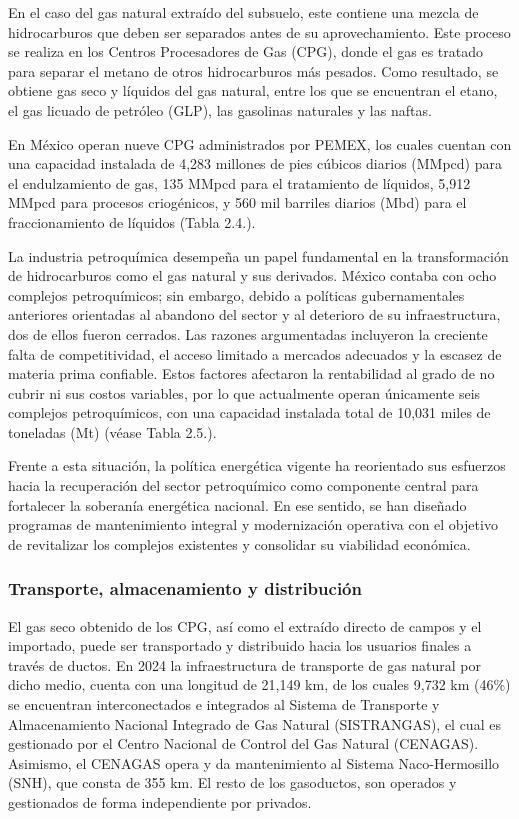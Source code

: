 \documentclass{sener2025}
\begin{document}
En el caso del gas natural extraído del subsuelo, este contiene una mezcla de hidrocarburos que deben ser separados antes de su aprovechamiento. Este proceso se realiza en los Centros Procesadores de Gas (CPG), donde el gas es tratado para separar el metano de otros hidrocarburos más pesados. Como resultado, se obtiene gas seco y líquidos del gas natural, entre los que se encuentran el etano, el gas licuado de petróleo (GLP), las gasolinas naturales y las naftas.

En México operan nueve CPG administrados por PEMEX, los cuales cuentan con una capacidad instalada de 4,283 millones de pies cúbicos diarios (MMpcd) para el endulzamiento de gas, 135 MMpcd para el tratamiento de líquidos, 5,912 MMpcd para procesos criogénicos, y 560 mil barriles diarios (Mbd) para el fraccionamiento de líquidos (Tabla 2.4.).

La industria petroquímica desempeña un papel fundamental en la transformación de hidrocarburos como el gas natural y sus derivados. México contaba con ocho complejos petroquímicos; sin embargo, debido a políticas gubernamentales anteriores orientadas al abandono del sector y al deterioro de su infraestructura, dos de ellos fueron cerrados. Las razones argumentadas incluyeron la creciente falta de competitividad, el acceso limitado a mercados adecuados y la escasez de materia prima confiable. Estos factores afectaron la rentabilidad al grado de no cubrir ni sus costos variables, por lo que actualmente operan únicamente seis complejos petroquímicos, con una capacidad instalada total de 10,031 miles de toneladas (Mt) (véase Tabla 2.5.).

Frente a esta situación, la política energética vigente ha reorientado sus esfuerzos hacia la recuperación del sector petroquímico como componente central para fortalecer la soberanía energética nacional. En ese sentido, se han diseñado programas de mantenimiento integral y modernización operativa con el objetivo de revitalizar los complejos existentes y consolidar su viabilidad económica.


\subsubsection{Transporte, almacenamiento y distribución}

El gas seco obtenido de los CPG, así como el extraído directo de campos y el importado, puede ser transportado y distribuido hacia los usuarios finales a través de ductos. En 2024 la infraestructura de transporte de gas natural por dicho medio, cuenta con una longitud de 21,149 km, de los cuales 9,732 km (46\%) se encuentran interconectados e integrados al Sistema de Transporte y Almacenamiento Nacional Integrado de Gas Natural (SISTRANGAS), el cual es gestionado por el Centro Nacional de Control del Gas Natural (CENAGAS). Asimismo, el CENAGAS opera y da mantenimiento al Sistema Naco-Hermosillo (SNH), que consta de 355 km. El resto de los gasoductos, son operados y gestionados de forma independiente por privados.
\end{document}
